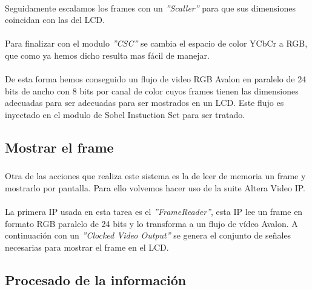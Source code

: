 \documentclass[a4paper,12pt,titlepage,final]{book}
\begin{document}
\paragraph{}
Seguidamente escalamos los frames con un \textit{''Scaller''} para que sus dimensiones coincidan con las del LCD.

\paragraph{}
Para finalizar con el modulo \textit{''CSC''} se cambia el espacio de color YCbCr a RGB, que como ya hemos dicho resulta mas fácil de manejar.

\paragraph{}
De esta forma hemos conseguido un flujo de video RGB Avalon en paralelo de 24 bits de ancho con 8 bits por canal de color cuyos frames tienen las dimensiones adecuadas para ser adecuadas para ser mostrados en un LCD. Este flujo es inyectado en el modulo de Sobel Instuction Set para ser tratado.

\subsection{Mostrar el frame}
\subsubsection*{}

\paragraph{}
Otra de las acciones que realiza este sistema es la de leer de memoria un frame y mostrarlo por pantalla. Para ello volvemos hacer uso de la suite Altera Video IP.

\paragraph{}
La primera IP usada en esta tarea es el \textit{''FrameReader''}, esta IP lee un frame en formato RGB paralelo de 24 bits y lo transforma a un flujo de vídeo Avalon. A continuación con un \textit{''Clocked Video Output''} se genera el conjunto de señales necesarias para mostrar el frame en el LCD.

\subsection{Procesado de la información}
\end{document}
